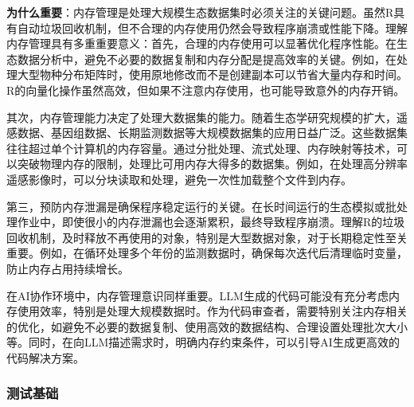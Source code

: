 \documentclass[
  twoside]{book}
\begin{document}
\textbf{为什么重要}：内存管理是处理大规模生态数据集时必须关注的关键问题。虽然R具有自动垃圾回收机制，但不合理的内存使用仍然会导致程序崩溃或性能下降。理解内存管理具有多重重要意义：首先，合理的内存使用可以显著优化程序性能。在生态数据分析中，避免不必要的数据复制和内存分配是提高效率的关键。例如，在处理大型物种分布矩阵时，使用原地修改而不是创建副本可以节省大量内存和时间。R的向量化操作虽然高效，但如果不注意内存使用，也可能导致意外的内存开销。

其次，内存管理能力决定了处理大数据集的能力。随着生态学研究规模的扩大，遥感数据、基因组数据、长期监测数据等大规模数据集的应用日益广泛。这些数据集往往超过单个计算机的内存容量。通过分批处理、流式处理、内存映射等技术，可以突破物理内存的限制，处理比可用内存大得多的数据集。例如，在处理高分辨率遥感影像时，可以分块读取和处理，避免一次性加载整个文件到内存。

第三，预防内存泄漏是确保程序稳定运行的关键。在长时间运行的生态模拟或批处理作业中，即使很小的内存泄漏也会逐渐累积，最终导致程序崩溃。理解R的垃圾回收机制，及时释放不再使用的对象，特别是大型数据对象，对于长期稳定性至关重要。例如，在循环处理多个年份的监测数据时，确保每次迭代后清理临时变量，防止内存占用持续增长。

在AI协作环境中，内存管理意识同样重要。LLM生成的代码可能没有充分考虑内存使用效率，特别是处理大规模数据时。作为代码审查者，需要特别关注内存相关的优化，如避免不必要的数据复制、使用高效的数据结构、合理设置处理批次大小等。同时，在向LLM描述需求时，明确内存约束条件，可以引导AI生成更高效的代码解决方案。

\hypertarget{ux6d4bux8bd5ux57faux7840}{%
\subsubsection{测试基础}\label{ux6d4bux8bd5ux57faux7840}}
\end{document}
